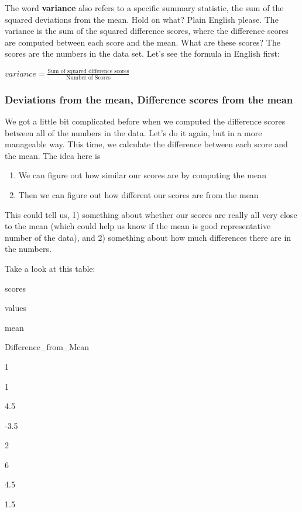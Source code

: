 \documentclass[]{book}
\providecommand{\tightlist}{%
  \setlength{\itemsep}{0pt}\setlength{\parskip}{0pt}}
\begin{document}
The word \textbf{variance} also refers to a specific summary statistic, the sum of the squared deviations from the mean. Hold on what? Plain English please. The variance is the sum of the squared difference scores, where the difference scores are computed between each score and the mean. What are these scores? The scores are the numbers in the data set. Let's see the formula in English first:

\(variance = \frac{\text{Sum of squared difference scores}}{\text{Number of Scores}}\)

\hypertarget{deviations-from-the-mean-difference-scores-from-the-mean}{%
\subsubsection{Deviations from the mean, Difference scores from the mean}\label{deviations-from-the-mean-difference-scores-from-the-mean}}

We got a little bit complicated before when we computed the difference scores between all of the numbers in the data. Let's do it again, but in a more manageable way. This time, we calculate the difference between each score and the mean. The idea here is

\begin{enumerate}
\def\labelenumi{\arabic{enumi}.}
\tightlist
\item
  We can figure out how similar our scores are by computing the mean
\item
  Then we can figure out how different our scores are from the mean
\end{enumerate}

This could tell us, 1) something about whether our scores are really all very close to the mean (which could help us know if the mean is good representative number of the data), and 2) something about how much differences there are in the numbers.

Take a look at this table:

scores

values

mean

Difference\_from\_Mean

1

1

4.5

-3.5

2

6

4.5

1.5
\end{document}
